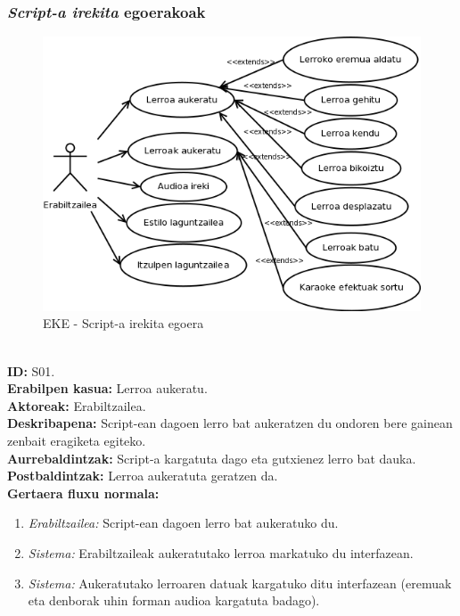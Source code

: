 \subsubsection{\textit{Script-a irekita} egoerakoak}
\begin{figure}[htp]
\begin{center}
\includegraphics[scale=0.6]{Pictures/Chapter4/Analisia/EKE-Script.png}
\caption{EKE - Script-a irekita egoera}
\label{eke-script}
\end{center}
\end{figure}
\noindent\\
\textbf{ID:} S01.\\
\textbf{Erabilpen kasua:} Lerroa aukeratu.\\
\textbf{Aktoreak:} Erabiltzailea.\\
\textbf{Deskribapena:} Script-ean dagoen lerro bat aukeratzen du ondoren bere gainean zenbait eragiketa egiteko.\\
\textbf{Aurrebaldintzak:}  Script-a kargatuta dago eta gutxienez lerro bat dauka.\\
\textbf{Postbaldintzak:} Lerroa aukeratuta geratzen da.\\
\textbf{Gertaera fluxu normala:}
\begin{enumerate}
	\item \textit{Erabiltzailea:} Script-ean dagoen lerro bat aukeratuko du.
	\item \textit{Sistema:} Erabiltzaileak aukeratutako lerroa markatuko du interfazean.
	\item \textit{Sistema:} Aukeratutako lerroaren datuak kargatuko ditu interfazean (eremuak eta denborak uhin forman audioa kargatuta badago).
\end{enumerate}
